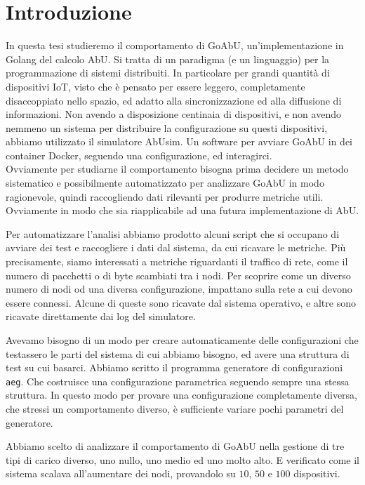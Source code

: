 \documentclass[12pt, a4paper]{article}
\newcommand{\aeg}[0]{{\lstinline{aeg}}\xspace}
\begin{document}
\newpage
\tableofcontents

\newpage

\section{Introduzione}

In questa tesi studieremo il comportamento di GoAbU, un'implementazione in Golang del calcolo AbU. Si tratta di un paradigma (e un linguaggio) per la programmazione di sistemi distribuiti.
In particolare per grandi quantità di dispositivi IoT, visto che è pensato per essere leggero, completamente disaccoppiato nello spazio, ed adatto alla sincronizzazione ed alla diffusione di informazioni.
Non avendo a disposizione centinaia di dispositivi, e non avendo nemmeno un sistema per distribuire la configurazione su questi dispositivi, abbiamo utilizzato il simulatore AbUsim. Un software per avviare GoAbU in dei container Docker, seguendo una configurazione, ed interagirci.\\
Ovviamente per studiarne il comportamento bisogna prima decidere un metodo sistematico e possibilmente automatizzato per analizzare GoAbU in modo ragionevole, quindi raccogliendo dati rilevanti per produrre metriche utili. Ovviamente in modo che sia riapplicabile ad una futura implementazione di AbU.

Per automatizzare l'analisi abbiamo prodotto alcuni script che si occupano di avviare dei test e raccogliere i dati dal sistema, da cui ricavare le metriche.
Più precisamente, siamo interessati a metriche riguardanti il traffico di rete, come il numero di pacchetti o di byte scambiati tra i nodi.
Per scoprire come un diverso numero di nodi od una diversa configurazione, impattano sulla rete a cui devono essere connessi. Alcune di queste sono ricavate dal sistema operativo, e altre sono ricavate direttamente dai log del simulatore.

Avevamo bisogno di un modo per creare automaticamente delle configurazioni che testassero le parti del sistema di cui abbiamo bisogno, ed avere una struttura di test su cui basarci. Abbiamo scritto il programma generatore di configurazioni \aeg. Che costruisce una configurazione parametrica seguendo sempre una stessa struttura.
In questo modo per provare una configurazione completamente diversa, che stressi un comportamento diverso, è sufficiente variare pochi parametri del generatore.

Abbiamo scelto di analizzare il comportamento di GoAbU nella gestione di tre tipi di carico diverso, uno nullo, uno medio ed uno molto alto. E verificato come il sistema scalava all'aumentare dei nodi, provandolo su $10$, $50$ e $100$ dispositivi.
\end{document}
